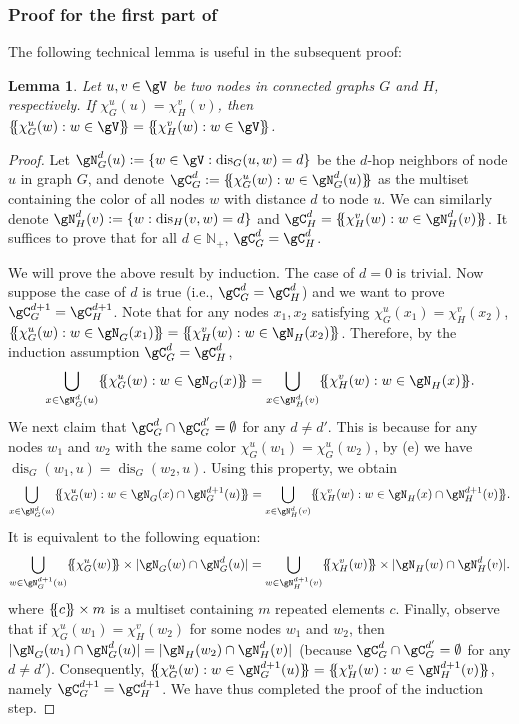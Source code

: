\documentclass{article} %
\let\cref\crtcref
\newtheorem{lemma}[theorem]{Lemma}
\newcommand*{\ldblbrace}{\{\mskip-5mu\{}
\newcommand*{\rdblbrace}{\}\mskip-5mu\}}
\newcommand*{\dis}{{\operatorname{dis}}}
\begin{document}
\subsubsection{Proof for the first part of \cref{thm:dsswl}}
\label{sec:proof_dsswl_cut_vertex}
The following technical lemma is useful in the subsequent proof:
\begin{lemma}
\label{thm:proof_dsswl_cut_vertex_1}
Let $u,v\in\gV$ be two nodes in connected graphs $G$ and $H$, respectively. If $\chi_G^u(u)=\chi_H^v(v)$, then $\ldblbrace \chi_G^u(w):w\in\gV\rdblbrace=\ldblbrace \chi_H^v(w):w\in\gV\rdblbrace$.
\end{lemma}
\begin{proof}
Let $\gN_G^d(u):=\{w\in\gV:\dis_G(u,w)=d\}$ be the $d$-hop neighbors of node $u$ in graph $G$, and denote $\gC_G^d:=\ldblbrace \chi_G^u(w):w\in\gN_G^d(u)\rdblbrace$ as the multiset containing the color of all nodes $w$ with distance $d$ to node $u$. We can similarly denote $\gN_H^d(v):=\{w:\dis_H(v,w)=d\}$ and $\gC_H^d=\ldblbrace \chi_H^v(w):w\in\gN_H^d(v)\rdblbrace$. It suffices to prove that for all $d\in\mathbb N_+$, $\gC_G^d=\gC_H^d$.

We will prove the above result by induction. The case of $d=0$ is trivial. Now suppose the case of $d$ is true (i.e., $\gC_G^d=\gC_H^d$) and we want to prove $\gC_G^{d+1}=\gC_H^{d+1}$. Note that for any nodes $x_1,x_2$ satisfying $\chi_G^u(x_1)=\chi_H^v(x_2)$, $\ldblbrace\chi_G^u(w):w\in\gN_G(x_1)\rdblbrace=\ldblbrace\chi_H^v(w):w\in\gN_H(x_2)\rdblbrace$. Therefore, by the induction assumption $\gC_G^d=\gC_H^d$,
\begin{equation*}
    \bigcup_{x\in\gN_G^d(u)}\ldblbrace\chi_G^u(w):w\in\gN_G(x)\rdblbrace=\bigcup_{x\in\gN_H^d(v)}\ldblbrace\chi_H^v(w):w\in\gN_H(x)\rdblbrace.
\end{equation*}
We next claim that $\gC_G^d\cap\gC_G^{d'}=\emptyset$ for any $d\neq d'$. This is because for any nodes $w_1$ and $w_2$ with the same color $\chi_G^u(w_1)=\chi_G^u(w_2)$, by \cref{thm:proof_dsswl_key}(e) we have $\dis_G(w_1,u)=\dis_G(w_2,u)$. Using this property, we obtain
\begin{equation*}
    \bigcup_{x\in\gN_G^d(u)}\ldblbrace\chi_G^u(w):w\in\gN_G(x)\cap\gN_G^{d+1}(u)\rdblbrace=\bigcup_{x\in\gN_H^d(v)}\ldblbrace\chi_H^v(w):w\in\gN_H(x)\cap\gN_H^{d+1}(v)\rdblbrace.
\end{equation*}
It is equivalent to the following equation:
\begin{equation*}
    \bigcup_{w\in\gN_G^{d+1}(u)}\ldblbrace\chi_G^u(w)\rdblbrace\times |\gN_G(w)\cap\gN_G^{d}(u)|=\bigcup_{w\in\gN_H^{d+1}(v)}\ldblbrace\chi_H^v(w)\rdblbrace\times |\gN_H(w)\cap\gN_H^{d}(v)|.
\end{equation*}
where $\ldblbrace c\rdblbrace\times m$ is a multiset containing $m$ repeated elements $c$. Finally, observe that if $\chi_G^u(w_1)=\chi_H^v(w_2)$ for some nodes $w_1$ and $w_2$, then $|\gN_G(w_1)\cap\gN_G^{d}(u)|=|\gN_H(w_2)\cap\gN_H^{d}(v)|$ (because $\gC_G^d\cap\gC_G^{d'}=\emptyset$ for any $d\neq d'$). Consequently, $\ldblbrace\chi_G^u(w):w\in\gN_G^{d+1}(u)\rdblbrace=\ldblbrace\chi_H^v(w):w\in\gN_H^{d+1}(v)\rdblbrace$, namely  $\gC_G^{d+1}=\gC_H^{d+1}$. We have thus completed the proof of the induction step.
\end{proof}
\end{document}
